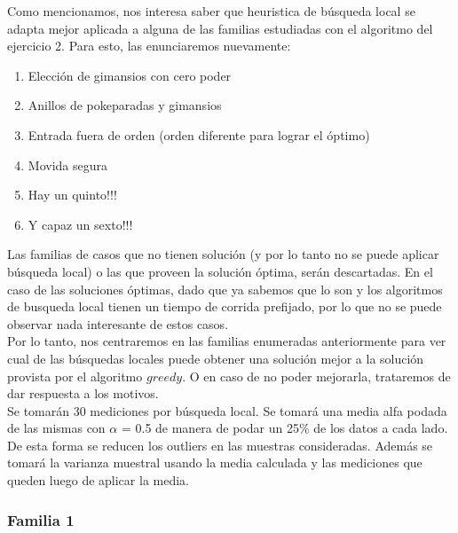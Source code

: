 Como mencionamos, nos interesa saber que heuristica de búsqueda local se adapta mejor aplicada a alguna de las familias estudiadas con el algoritmo del ejercicio 2. Para esto, las enunciaremos nuevamente:

\begin{enumerate}
\item Elección de gimansios con cero poder 
\item Anillos de pokeparadas y gimansios
\item Entrada fuera de orden (orden diferente para lograr el óptimo)
\item Movida segura
\item Hay un quinto!!!
\item Y capaz un sexto!!!
\end{enumerate}

Las familias de casos que no tienen solución (y por lo tanto no se puede aplicar búsqueda local) o las que proveen la solución óptima, serán descartadas. En el caso de las soluciones óptimas, dado que ya sabemos que lo son y los algoritmos de busqueda local tienen un tiempo de corrida prefijado, por lo que no se puede observar nada interesante de estos casos.\\
Por lo tanto, nos centraremos en las familias enumeradas anteriormente para ver cual de las búsquedas locales puede obtener una solución mejor a la solución provista por el algoritmo $greedy$. O en caso de no poder mejorarla, trataremos de dar respuesta a los motivos.\\

Se tomarán 30 mediciones por búsqueda local. Se tomará una media alfa podada de las mismas con $\alpha$ = 0.5 de manera de podar un 25\% de los datos a cada lado. De esta forma se reducen los outliers en las muestras consideradas. 
Además se tomará la varianza muestral usando la media calculada y las mediciones que queden luego de aplicar la media.\\

\subsubsection*{Familia 1}

